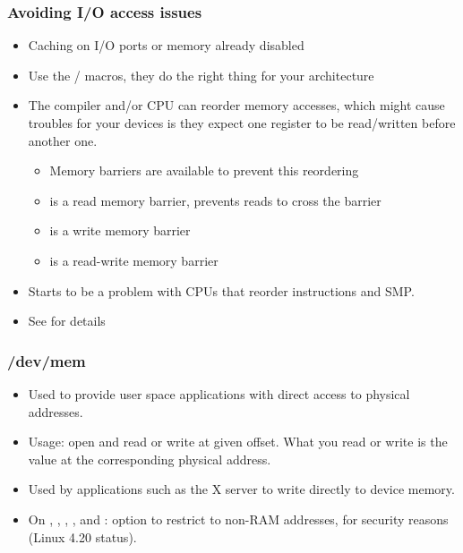 \begin{frame}
  \frametitle{Avoiding I/O access issues}
  \begin{itemize}
  \item Caching on I/O ports or memory already disabled
  \item Use the / macros,
        they do the right thing for your architecture
  \item The compiler and/or CPU can reorder memory accesses, which
    might cause troubles for your devices is they expect one register
    to be read/written before another one.
    \begin{itemize}
    \item Memory barriers are available to prevent this reordering
    \item {} is a read memory barrier, prevents reads to
      cross the barrier
    \item {} is a write memory barrier
    \item {} is a read-write memory barrier
    \end{itemize}
  \item Starts to be a problem with CPUs that reorder instructions and
    SMP.
  \item See  for details
  \end{itemize}
\end{frame}

\begin{frame}
  \frametitle{/dev/mem}
  \begin{itemize}
  \item Used to provide user space applications with direct access to
    physical addresses.
  \item Usage: open  and read or write at given offset.
    What you read or write is the value at the corresponding physical
    address.
  \item Used by applications such as the X server to write directly to
    device memory.
  \item On , , ,
    ,  and :
     option to restrict 
    to non-RAM addresses, for security reasons (Linux 4.20 status).
\end{itemize}
\end{frame}
